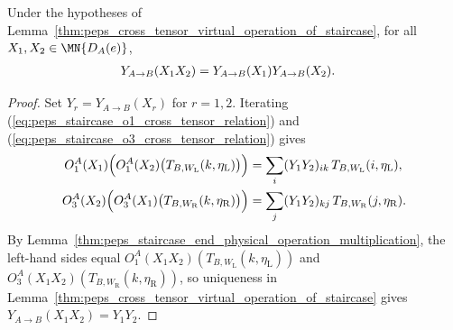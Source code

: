 \begin{lemma}%
    \label{thm:peps_staircase_cross_tensor_virtual_operation_multiplication}
    \leanok
    Under the hypotheses of
    Lemma~\ref{thm:peps_cross_tensor_virtual_operation_of_staircase}, for all
    $X_1,X_2\in\MN{D_A(e)}$,
    \begin{align}
        Y_{A\to B}(X_1X_2)
         & =Y_{A\to B}(X_1)Y_{A\to B}(X_2).
        \notag
    \end{align}
\end{lemma}
\begin{proof}
    \leanok
    Set $Y_r=Y_{A\to B}(X_r)$ for $r=1,2$. Iterating
    (\ref{eq:peps_staircase_o1_cross_tensor_relation}) and
    (\ref{eq:peps_staircase_o3_cross_tensor_relation}) gives
    \begin{align}
        O_1^A(X_1)\Bigl(O_1^A(X_2)
        \bigl(T_{B,W_{\mathrm L}}(k,\eta_{\mathrm L})\bigr)\Bigr)
         & =\sum_i (Y_1Y_2)_{ik}\,
        T_{B,W_{\mathrm L}}(i,\eta_{\mathrm L}),
        \notag                     \\
        O_3^A(X_2)\Bigl(O_3^A(X_1)
        \bigl(T_{B,W_{\mathrm R}}(k,\eta_{\mathrm R})\bigr)\Bigr)
         & =\sum_j (Y_1Y_2)_{kj}\,
        T_{B,W_{\mathrm R}}(j,\eta_{\mathrm R}).
        \notag
    \end{align}
    By Lemma~\ref{thm:peps_staircase_end_physical_operation_multiplication},
    the left-hand sides equal $O_1^A(X_1X_2)(T_{B,W_{\mathrm L}}(k,\eta_{\mathrm L}))$
    and $O_3^A(X_1X_2)(T_{B,W_{\mathrm R}}(k,\eta_{\mathrm R}))$, so uniqueness
    in Lemma~\ref{thm:peps_cross_tensor_virtual_operation_of_staircase} gives
    $Y_{A\to B}(X_1X_2)=Y_1Y_2$.
\end{proof}

